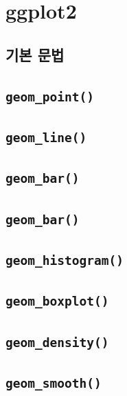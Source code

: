 \documentclass[
  11pt,
]{krantz}
\begin{document}
\hypertarget{ggplot2}{%
\section{ggplot2}\label{ggplot2}}

\hypertarget{uxae30uxbcf8-uxbb38uxbc95}{%
\subsection{기본 문법}\label{uxae30uxbcf8-uxbb38uxbc95}}

\hypertarget{geom_point}{%
\subsection{\texorpdfstring{\texttt{geom\_point()}}{geom\_point()}}\label{geom_point}}

\hypertarget{geom_line}{%
\subsection{\texorpdfstring{\texttt{geom\_line()}}{geom\_line()}}\label{geom_line}}

\hypertarget{geom_bar}{%
\subsection{\texorpdfstring{\texttt{geom\_bar()}}{geom\_bar()}}\label{geom_bar}}

\hypertarget{geom_bar-1}{%
\subsection{\texorpdfstring{\texttt{geom\_bar()}}{geom\_bar()}}\label{geom_bar-1}}

\hypertarget{geom_histogram}{%
\subsection{\texorpdfstring{\texttt{geom\_histogram()}}{geom\_histogram()}}\label{geom_histogram}}

\hypertarget{geom_boxplot}{%
\subsection{\texorpdfstring{\texttt{geom\_boxplot()}}{geom\_boxplot()}}\label{geom_boxplot}}

\hypertarget{geom_density}{%
\subsection{\texorpdfstring{\texttt{geom\_density()}}{geom\_density()}}\label{geom_density}}

\hypertarget{geom_smooth}{%
\subsection{\texorpdfstring{\texttt{geom\_smooth()}}{geom\_smooth()}}\label{geom_smooth}}

  

\printindex
\end{document}
